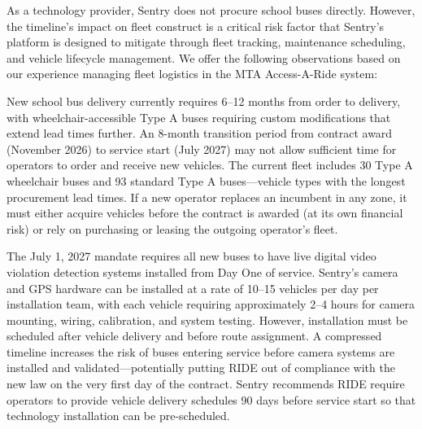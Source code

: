 \vspace{0.3cm}

As a technology provider, Sentry does not procure school buses directly. However, the timeline's impact on fleet construct is a critical risk factor that Sentry's platform is designed to mitigate through fleet tracking, maintenance scheduling, and vehicle lifecycle management. We offer the following observations based on our experience managing fleet logistics in the MTA Access-A-Ride system:

\begin{description}[style=nextline, leftmargin=0.5cm]
    \item[\faIcon{bus} \textbf{Vehicle Procurement Lead Times:}] New school bus delivery currently requires 6--12 months from order to delivery, with wheelchair-accessible Type A buses requiring custom modifications that extend lead times further. An 8-month transition period from contract award (November 2026) to service start (July 2027) may not allow sufficient time for operators to order and receive new vehicles. The current fleet includes 30 Type A wheelchair buses and 93 standard Type A buses---vehicle types with the longest procurement lead times. If a new operator replaces an incumbent in any zone, it must either acquire vehicles before the contract is awarded (at its own financial risk) or rely on purchasing or leasing the outgoing operator's fleet.

    \item[\faIcon{video} \textbf{Video System Installation:}] The July 1, 2027 mandate requires all new buses to have live digital video violation detection systems installed from Day One of service. Sentry's camera and GPS hardware can be installed at a rate of 10--15 vehicles per day per installation team, with each vehicle requiring approximately 2--4 hours for camera mounting, wiring, calibration, and system testing. However, installation must be scheduled after vehicle delivery and before route assignment. A compressed timeline increases the risk of buses entering service before camera systems are installed and validated---potentially putting RIDE out of compliance with the new law on the very first day of the contract. Sentry recommends RIDE require operators to provide vehicle delivery schedules 90 days before service start so that technology installation can be pre-scheduled.


\end{description}
